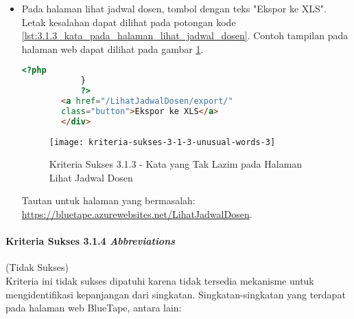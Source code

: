 \begin{itemize}
    \item Pada halaman lihat jadwal dosen, tombol dengan teks "Ekspor ke XLS". Letak kesalahan dapat dilihat pada potongan kode \ref{lst:3.1.3_kata_pada_halaman_lihat_jadwal_dosen}. Contoh tampilan pada halaman web dapat dilihat pada gambar \ref{fig:3.1.3_unusual_words_3}.
    \begin{lstlisting}[frame=single, label={lst:3.1.3_kata_pada_halaman_lihat_jadwal_dosen}, language=HTML, caption=Kriteria Sukses 3.1.3 - Kata yang Tak Lazim pada Halaman Lihat Jadwal Dosen]
            <?php
            }
            ?>
        <a href="/LihatJadwalDosen/export/" 
        class="button">Ekspor ke XLS</a>
        </div> 
    \end{lstlisting}
    
    \begin{figure}[H]
        \centering  
        \texttt{[image: kriteria-sukses-3-1-3-unusual-words-3]}  
        \caption[Kriteria Sukses 3.1.3 - Kata yang Tak Lazim pada Halaman Lihat Jadwal Dosen]{Kriteria Sukses 3.1.3 - Kata yang Tak Lazim pada Halaman Lihat Jadwal Dosen}
        \label{fig:3.1.3_unusual_words_3}  
    \end{figure}
    Tautan untuk halaman yang bermasalah: \url{https://bluetape.azurewebsites.net/LihatJadwalDosen}.

\end{itemize}

\paragraph{Kriteria Sukses 3.1.4 \textit{Abbreviations}}
\label{par:kepatuhan_bluetape_kriteria_sukses_3.1.4}
(Tidak Sukses)\\

Kriteria ini tidak sukses dipatuhi karena tidak tersedia mekanisme untuk mengidentifikasi kepanjangan dari singkatan. Singkatan-singkatan yang terdapat pada halaman web BlueTape, antara lain:

